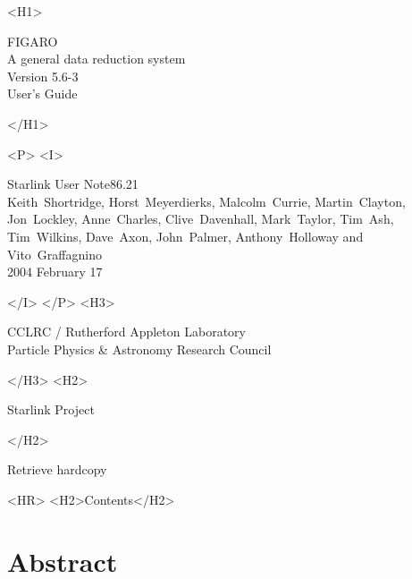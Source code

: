 \documentclass[11pt,twoside]{article}
\newcommand{\Figaroversion}{5.6-3~}
\newcommand{\stardoccategory}  {Starlink User Note}
\newcommand{\stardocsource}    {sun\stardocnumber}
\newcommand{\stardocnumber}    {86.21}
\newcommand{\stardocauthors}   {Keith~Shortridge, Horst~Meyerdierks,
                                Malcolm~Currie, Martin~Clayton, Jon~Lockley,
                                Anne~Charles, Clive~Davenhall,
                                Mark~Taylor, Tim~Ash, Tim~Wilkins, Dave~Axon,
                                John~Palmer, Anthony~Holloway and
                                Vito~Graffagnino}
\newcommand{\stardocdate}      {2004 February 17}
\newcommand{\stardoctitle}     {FIGARO \\ [1ex] A general data reduction system}
\newcommand{\stardocversion}   {Version \Figaroversion}
\newcommand{\stardocmanual}    {User's Guide}
\newcommand{\htmladdnormallink}[2]{#1}
\newcommand{\htmladdimg}[1]{}
\newcommand{\htmlref}[2]{#1}
\newcommand{\htmladdtonavigation}[1]{}
\newcommand{\xlabel}[1]{}
\newcommand{\latexonlytoc}[0]{\tableofcontents}
\begin{document}
\begin{htmlonly}
   \xlabel{}
   \begin{rawhtml} <H1> \end{rawhtml}
      \stardoctitle\\
      \stardocversion\\
      \stardocmanual
   \begin{rawhtml} </H1> \end{rawhtml}


   \begin{rawhtml} <P> <I> \end{rawhtml}
   \stardoccategory \stardocnumber \\
   \stardocauthors \\
   \stardocdate
   \begin{rawhtml} </I> </P> <H3> \end{rawhtml}
      \htmladdnormallink{CCLRC}{http://www.cclrc.ac.uk} /
      \htmladdnormallink{Rutherford Appleton Laboratory}
                        {http://www.cclrc.ac.uk/ral} \\
      \htmladdnormallink{Particle Physics \& Astronomy Research Council}
                        {http://www.pparc.ac.uk} \\
   \begin{rawhtml} </H3> <H2> \end{rawhtml}
      \htmladdnormallink{Starlink Project}{http://www.starlink.ac.uk/}
   \begin{rawhtml} </H2> \end{rawhtml}
   \htmladdnormallink{\htmladdimg{source.gif} Retrieve hardcopy}
      {http://www.starlink.ac.uk/cgi-bin/hcserver?\stardocsource}\\

  \label{stardoccontents}
  \begin{rawhtml}
    <HR>
    <H2>Contents</H2>
  \end{rawhtml}
  \newcommand{\latexonlytoc}[0]{}
  \htmladdtonavigation{\htmlref{\htmladdimg{contents_motif.gif}}
        {stardoccontents}}

  \section{\xlabel{abstract}Abstract}
\end{htmlonly}
\end{document}
